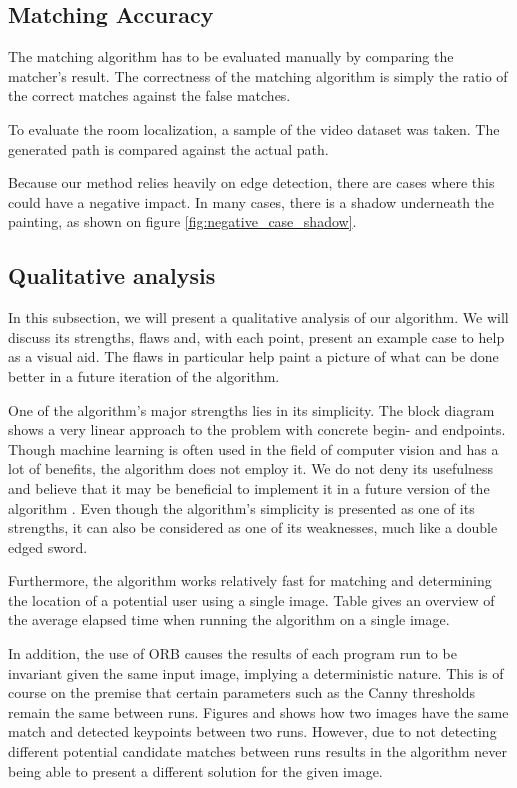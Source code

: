 \subsection{Matching Accuracy}
The matching algorithm has to be evaluated manually by comparing the matcher's result. The correctness of the matching algorithm is simply the ratio of the correct matches against the false matches.

To evaluate the room localization, a sample of the video dataset was taken. The generated path is compared against the actual path.

Because our method relies heavily on edge detection, there are cases where this could have a negative impact. In many cases, there is a shadow underneath the painting, as shown on figure \ref{fig:negative_case_shadow}.



\subsection{Qualitative analysis}
In this subsection, we will present a qualitative analysis of our algorithm. We will discuss its strengths, flaws and, with each point, present an example case to help as a visual aid. The flaws in particular help paint a picture of what can be done better in a future iteration of the algorithm. 


One of the algorithm's major strengths lies in its simplicity. The block diagram shows a very linear approach to the problem with concrete begin- and endpoints. Though machine learning is often used in the field of computer vision and has a lot of benefits, the algorithm does not employ it. We do not deny its usefulness and believe that it may be beneficial to implement it in a future version of the algorithm . Even though the algorithm's simplicity is presented as one of its strengths, it can also be considered as one of its weaknesses, much like a double edged sword.


Furthermore, the algorithm works relatively fast for matching and determining the location of a potential user using a single image. Table  gives an overview of the average elapsed time when running the algorithm on a single image. 


In addition, the use of ORB causes the results of each program run to be invariant given the same input image, implying a deterministic nature. This is of course on the premise that certain parameters such as the Canny thresholds remain the same between runs. Figures  and  shows how two images have the same match and detected keypoints between two runs. However, due to not detecting different potential candidate matches between runs results in the algorithm never being able to present a different solution for the given image.


